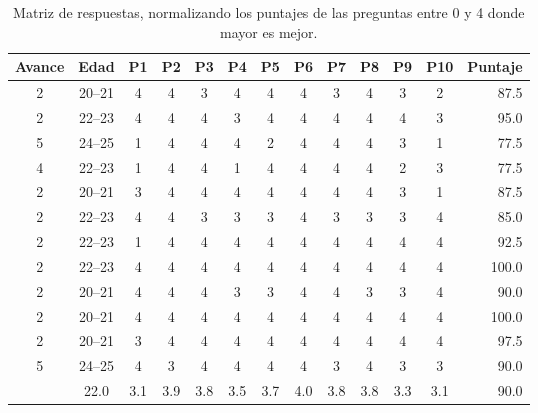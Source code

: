 \begin{table}[hbt]
    \caption[Matriz de respuestas]{Matriz de respuestas, normalizando los puntajes de las preguntas entre 0 y 4 donde mayor es mejor.}
    \label{tab:respuestas}
    \centering
    \begin{tabular}{@{}ccccccccccccr@{}}
    \toprule
    \textbf{Avance} & \textbf{Edad} & \textbf{P1}  & \textbf{P2}  & \textbf{P3}  & \textbf{P4}  & \textbf{P5}  & \textbf{P6}  & \textbf{P7}  & \textbf{P8}  & \textbf{P9}  & \textbf{P10} & \textbf{Puntaje} \\ \midrule
    2      & 20--21   & 4   & 4   & 3   & 4   & 4   & 4   & 3   & 4   & 3   & 2   & 87.5    \\
    2      & 22--23   & 4   & 4   & 4   & 3   & 4   & 4   & 4   & 4   & 4   & 3   & 95.0    \\
    5      & 24--25   & 1   & 4   & 4   & 4   & 2   & 4   & 4   & 4   & 3   & 1   & 77.5    \\
    4      & 22--23   & 1   & 4   & 4   & 1   & 4   & 4   & 4   & 4   & 2   & 3   & 77.5    \\
    2      & 20--21   & 3   & 4   & 4   & 4   & 4   & 4   & 4   & 4   & 3   & 1   & 87.5    \\
    2      & 22--23   & 4   & 4   & 3   & 3   & 3   & 4   & 3   & 3   & 3   & 4   & 85.0    \\
    2      & 22--23   & 1   & 4   & 4   & 4   & 4   & 4   & 4   & 4   & 4   & 4   & 92.5    \\
    2      & 22--23   & 4   & 4   & 4   & 4   & 4   & 4   & 4   & 4   & 4   & 4   & 100.0   \\
    2      & 20--21   & 4   & 4   & 4   & 3   & 3   & 4   & 4   & 3   & 3   & 4   & 90.0    \\
    2      & 20--21   & 4   & 4   & 4   & 4   & 4   & 4   & 4   & 4   & 4   & 4   & 100.0   \\
    2      & 20--21   & 3   & 4   & 4   & 4   & 4   & 4   & 4   & 4   & 4   & 4   & 97.5    \\
    5      & 24--25   & 4   & 3   & 4   & 4   & 4   & 4   & 3   & 4   & 3   & 3   & 90.0    \\ \addlinespace[3pt]
    2.7    & 22.0 & 3.1 & 3.9 & 3.8 & 3.5 & 3.7 & 4.0 & 3.8 & 3.8 & 3.3 & 3.1 & 90.0    \\ \bottomrule
    \end{tabular}
\end{table}

